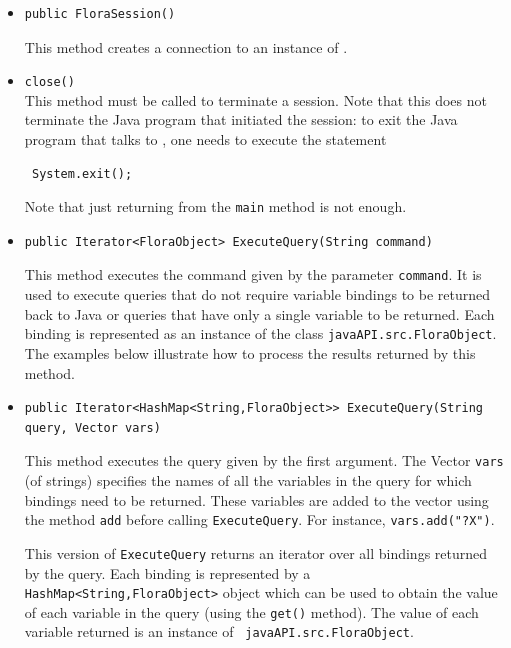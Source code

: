 \begin{itemize}
\item
\begin{verbatim}
public FloraSession()
\end{verbatim}
  This method creates a connection to an instance of \FLSYSTEM.
\item {\tt close()} \\
  This method must be called to terminate a \FLSYSTEM session. Note that this does
  not terminate the Java program that initiated the session:
  to exit the Java program that talks to \FLSYSTEM, one needs to execute
  the statement
\begin{verbatim}
 System.exit();  
\end{verbatim}
  Note that just returning from the {\tt main} method is not enough. 

\item
\begin{verbatim}
public Iterator<FloraObject> ExecuteQuery(String command)
\end{verbatim}
    This method executes the \FLSYSTEM command given by the
parameter {\tt command}.  It is used to execute \FLSYSTEM queries that
do not require variable bindings to be returned back to Java or queries that
have only
a single variable to be returned. Each binding is represented as
an instance of the class {\tt javaAPI.src.FloraObject}.
The examples below illustrate how to process the results returned by this
method.

\item
\begin{verbatim}
public Iterator<HashMap<String,FloraObject>> ExecuteQuery(String query, Vector vars)
\end{verbatim}
  This method executes the \FLSYSTEM query given by the first argument. The
  Vector {\tt vars} (of strings) specifies the names of all the variables
  in the query for which bindings need to be returned. These variables are
  added to the vector using the method {\tt add} before calling
  {\tt ExecuteQuery}. For instance, {\tt vars.add("?X")}.  
  
  This version of {\tt ExecuteQuery} returns an iterator over all bindings
  returned by the \FLSYSTEM query.  Each binding is represented by a {\tt
    HashMap<String,FloraObject>} 
  object which can be used to obtain the value of each variable in the
  query (using the {\tt get()} method). The value of each variable returned
  is an instance of {\tt
    javaAPI.src.FloraObject}.


\end{itemize}
